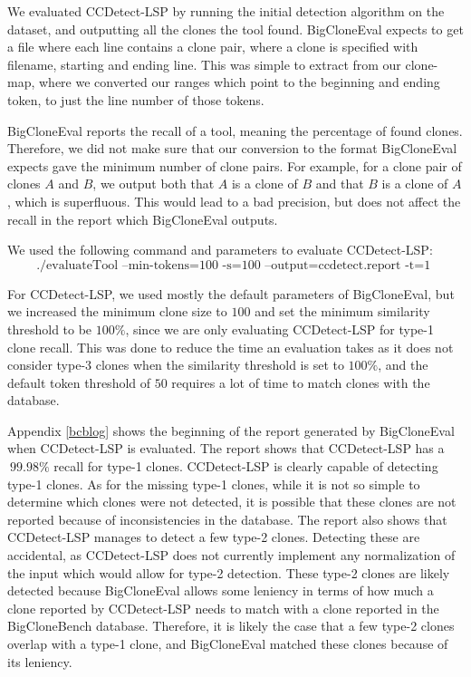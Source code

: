 We evaluated CCDetect-LSP by running the initial detection algorithm on the dataset, and
outputting all the clones the tool found. BigCloneEval expects to get a file where each
line contains a clone pair, where a clone is specified with filename, starting and
ending line. This was simple to extract from our clone-map, where we converted our ranges
which point to the beginning and ending token, to just the line number of those tokens.

BigCloneEval reports the recall of a tool, meaning the percentage of found clones.
Therefore, we did not make sure that our conversion to the format BigCloneEval expects
gave the minimum number of clone pairs. For example, for a clone pair of clones $A$ and
$B$, we output both that $A$ is a clone of $B$ and that $B$ is a clone of $A$, which is
superfluous. This would lead to a bad precision, but does not affect the recall in the
report which BigCloneEval outputs.

We used the following command and parameters to evaluate CCDetect-LSP:
$$
\text{./evaluateTool --min-tokens=100 -s=100 --output=ccdetect.report -t=1 }
$$

For CCDetect-LSP, we used mostly the default parameters of BigCloneEval, but we increased
the minimum clone size to $100$ and set the minimum similarity threshold to be $100\%$,
since we are only evaluating CCDetect-LSP for type-1 clone recall. This was done to reduce
the time an evaluation takes as it does not consider type-3 clones when the similarity
threshold is set to $100\%$, and the default token threshold of $50$ requires a lot of
time to match clones with the database.

Appendix \ref{bcblog} shows the beginning of the report generated by BigCloneEval when
CCDetect-LSP is evaluated. The report shows that CCDetect-LSP has a $~99.98\%$ recall for
type-1 clones. CCDetect-LSP is clearly capable of detecting type-1 clones. As for the
missing type-1 clones, while it is not so simple to determine which clones were not
detected, it is possible that these clones are not reported because of inconsistencies in
the database. The report also shows that CCDetect-LSP manages to detect a few type-2
clones. Detecting these are accidental, as CCDetect-LSP does not currently implement any
normalization of the input which would allow for type-2 detection. These type-2 clones are
likely detected because BigCloneEval allows some leniency in terms of how much a clone
reported by CCDetect-LSP needs to match with a clone reported in the BigCloneBench
database. Therefore, it is likely the case that a few type-2 clones overlap with a type-1
clone, and BigCloneEval matched these clones because of its leniency.

